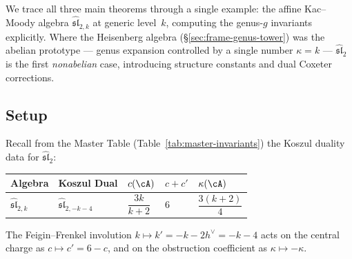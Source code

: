 We trace all three main theorems through a single example: the affine Kac--Moody algebra $\widehat{\mathfrak{sl}}_{2,k}$ at generic level~$k$, computing the genus-$g$ invariants explicitly.  Where the Heisenberg algebra (\S\ref{sec:frame-genus-tower}) was the abelian prototype --- genus expansion controlled by a single number $\kappa = k$ --- $\widehat{\mathfrak{sl}}_2$ is the first \emph{nonabelian} case, introducing structure constants and dual Coxeter corrections.

\subsection{Setup}\label{subsec:sl2-genus-setup}

Recall from the Master Table (Table~\ref{tab:master-invariants}) the Koszul duality data for $\widehat{\mathfrak{sl}}_2$:
\begin{center}
\renewcommand{\arraystretch}{1.4}
\begin{tabular}{lllll}
\toprule
Algebra & Koszul Dual & $c(\cA)$ & $c + c'$ & $\kappa(\cA)$ \\
\midrule
$\widehat{\mathfrak{sl}}_{2,k}$ & $\widehat{\mathfrak{sl}}_{2,-k-4}$ & $\dfrac{3k}{k+2}$ & $6$ & $\dfrac{3(k+2)}{4}$ \\[6pt]
\bottomrule
\end{tabular}
\end{center}
The Feigin--Frenkel involution $k \mapsto k' = -k - 2h^\vee = -k-4$ acts on the central charge as $c \mapsto c' = 6 - c$, and on the obstruction coefficient as $\kappa \mapsto -\kappa$.

